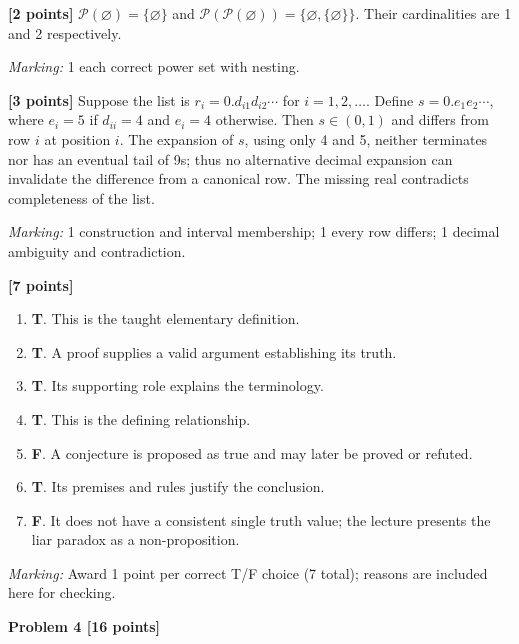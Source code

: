 \documentclass[12pt,letterpaper]{article}
\newcommand{\problemheading}[2][5\baselineskip]{\Needspace{#1}\par\noindent\hspace*{-0.625in}\textbf{#2}\par\nobreak\vspace{0.3em}}
\begin{document}
\begin{description}[font=\normalfont,leftmargin=1.2em,labelsep=0.4em]
\item[(a)] \textbf{[2 points]} $\mathcal P(\varnothing)=\{\varnothing\}$ and $\mathcal P(\mathcal P(\varnothing))=\{\varnothing,\{\varnothing\}\}$. Their cardinalities are 1 and 2 respectively.
\par\textit{Marking:} 1 each correct power set with nesting.
\item[(b)] \textbf{[3 points]} Suppose the list is $r_i=0.d_{i1}d_{i2}\cdots$ for $i=1,2,\ldots$. Define $s=0.e_1e_2\cdots$, where $e_i=5$ if $d_{ii}=4$ and $e_i=4$ otherwise. Then $s\in(0,1)$ and differs from row $i$ at position $i$. The expansion of $s$, using only 4 and 5, neither terminates nor has an eventual tail of 9s; thus no alternative decimal expansion can invalidate the difference from a canonical row. The missing real contradicts completeness of the list.
\par\textit{Marking:} 1 construction and interval membership; 1 every row differs; 1 decimal ambiguity and contradiction.
\item[(c)] \textbf{[7 points]} \begin{enumerate}[label=(\roman*)]\item \textbf{T}. This is the taught elementary definition.\item \textbf{T}. A proof supplies a valid argument establishing its truth.\item \textbf{T}. Its supporting role explains the terminology.\item \textbf{T}. This is the defining relationship.\item \textbf{F}. A conjecture is proposed as true and may later be proved or refuted.\item \textbf{T}. Its premises and rules justify the conclusion.\item \textbf{F}. It does not have a consistent single truth value; the lecture presents the liar paradox as a non-proposition.\end{enumerate}
\par\textit{Marking:} Award 1 point per correct T/F choice (7 total); reasons are included here for checking.
\end{description}
\vspace{0.65em}
\problemheading[\dimexpr 3\baselineskip+4\baselineskip\relax]{Problem 4 [16 points]}
\end{document}
